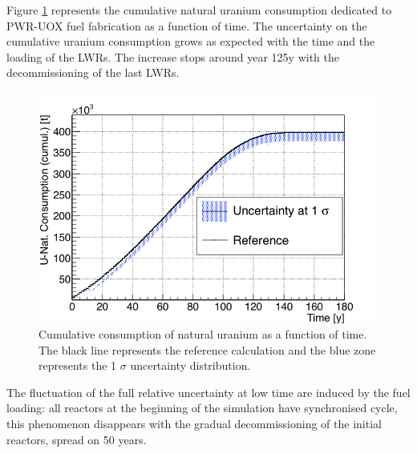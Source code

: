 \documentclass{anstrans}
\begin{document}
Figure \ref{fig:unat_full} represents the cumulative natural uranium consumption
dedicated to PWR-UOX fuel fabrication as a function of time.  The uncertainty on
the cumulative uranium consumption grows as expected with the time and the
loading of the \glspl{LWR}.  The increase stops around year 125y with the
decommissioning of the last \glspl{LWR}.

\begin{figure}[ht] %
    \centering
    \includegraphics[scale=0.35]{unat_full}
    \caption{Cumulative consumption of natural uranium as a function of time.  The black line
        represents the reference calculation and the blue zone
        represents the 1 $\sigma$ uncertainty distribution.}\label{fig:unat_full}
\end{figure}


The fluctuation of the full relative uncertainty at low time are induced by the
fuel loading: all reactors at the beginning of the simulation have synchronised
cycle, this phenomenon disappears with the gradual decommissioning of the
initial reactors, spread on 50 years.
\end{document}
